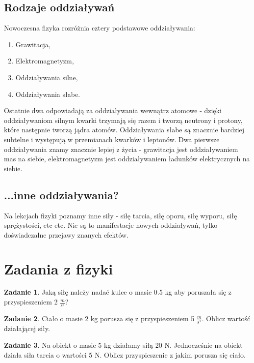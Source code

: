 \documentclass[11pt]{article}
\theoremstyle{definition}
\newtheorem{zad}{Zadanie}
\numberwithin{zad}{section}
\begin{document}
\subsection{Rodzaje oddziaływań}

Nowoczesna fizyka rozróżnia cztery podstawowe oddziaływania:

\begin{enumerate}
\item Grawitacja,
\item Elektromagnetyzm,
\item Oddziaływania silne,
\item Oddziaływania słabe.
\end{enumerate}

Ostatnie dwa odpowiadają za oddziaływania wewnątrz atomowe - dzięki oddziaływaniom silnym kwarki trzymają się razem i tworzą neutrony i protony, które następnie tworzą jądra atomów. Oddziaływania słabe są znacznie bardziej subtelne i występują w przemianach kwarków i leptonów. Dwa pierwsze oddziaływania znamy znacznie lepiej z życia - grawitacja jest oddziaływaniem mas na siebie, elektromagnetyzm jest oddziaływaniem ładunków elektrycznych na siebie.

\subsection{...inne oddziaływania?}

Na lekcjach fizyki poznamy inne siły - siłę tarcia, siłę oporu, siłę wyporu, siłę sprężystości, etc etc. Nie są to manifestacje nowych oddziaływań, tylko doświadczalne przejawy znanych efektów.

\section{Zadania z fizyki}

\begin{zad}
Jaką siłę należy nadać kulce o masie 0.5 kg aby poruszała się z przyspieszeniem 2 $\frac m{s^2}$?
\end{zad}

\begin{zad}
Ciało o masie 2 kg porusza się  z przyspieszeniem 5 $\frac m{s^2}$. Oblicz wartość działającej siły.
\end{zad}

\begin{zad}
Na obiekt o masie 5 kg działamy siłą 20 N. Jednocześnie na obiekt działa siła tarcia o wartości 5 N. Oblicz przyspieszenie z jakim porusza się ciało.
\end{zad}
\end{document}
